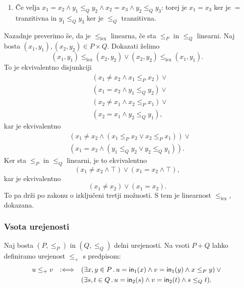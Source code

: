 \begin{dokaz}
\begin{enumerate}
  \item Če velja $x_1 = x_2 \land y_1 \leq_Q y_2 \land x_2 = x_3 \land y_2 \leq_Q y_3$: torej je $x_1 = x_3$ ker je $=$ tranzitivna in $y_1 \leq_Q y_3$ ker je $\leq_Q$ tranzitivna.
  \end{enumerate}
  Nazadnje preverimo še, da je $\leq_\mathrm{lex}$ linearna, če sta $\leq_P$ in $\leq_Q$ linearni. Naj bosta $(x_1,y_1), (x_2,y_2) \in P \times Q$. Dokazati želimo
  \begin{equation*}
    (x_1, y_1) \leq_\mathrm{lex} (x_2, y_2) \lor (x_2, y_2) \leq_\mathrm{lex} (x_1, y_1).
  \end{equation*}
  To je ekvivalentno disjunkciji
  \begin{align*}
    & (x_1 \neq x_2 \land x_1 \leq_P x_2) \lor {} \\
    & (x_1 = x_2 \land y_1 \leq_Q y_2) \lor {} \\
    & (x_2 \neq x_1 \land x_2 \leq_P x_1) \lor {} \\
    & (x_2 = x_1 \land y_2 \leq_Q y_1),
  \end{align*}
  kar je ekvivalentno
  \begin{align*}
    & (x_1 \neq x_2 \land (x_1 \leq_P x_2 \lor x_2 \leq_P x_1)) \lor {} \\
    &(x_1 = x_2 \land (y_1 \leq_Q y_2 \lor y_2 \leq_Q y_1)).
  \end{align*}
  Ker sta $\leq_P$ in $\leq_Q$ linearni, je to ekvivalentno
  \begin{equation*}
    (x_1 \neq x_2 \land \top) \lor (x_1 = x_2 \land \top),
  \end{equation*}
  kar je ekvivalentno
  \begin{equation*}
    (x_1 \neq x_2) \lor (x_1 = x_2).
  \end{equation*}
  To pa drži po zakonu o izključeni tretji možnosti. S tem je linearnost $\leq_\mathrm{lex}$, dokazana.
\end{dokaz}

\subsubsection{Vsota urejenosti}

Naj bosta $(P, \leq_P)$ in $(Q, \leq_Q)$ delni urejenosti. Na vsoti $P + Q$ lahko
definiramo urejenost $\leq_{+}$ s predpisom:
%
\begin{equation*}
  u \leq_{+} v \quad {{:}{\Longleftrightarrow}}\quad
  \begin{aligned}[t]
    & (\exists x, y \in P \,.\, u = \mathsf{in}_{1}(x) \land v = \mathsf{in}_{1}(y) \land x \leq_P y) \lor {} \\
    & (\exists s, t \in Q \,.\, u = \mathsf{in}_{2}(s) \land v = \mathsf{in}_{2}(t) \land s \leq_Q t).
  \end{aligned}
\end{equation*}

